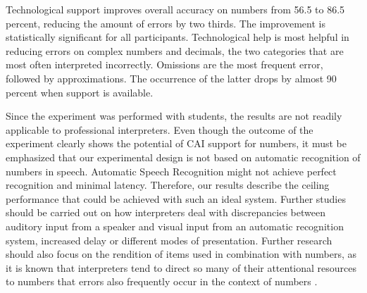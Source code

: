 \documentclass[output=paper]{langsci/langscibook}
\begin{document}
Technological support improves overall accuracy on numbers from 56.5 to 86.5 percent, reducing the amount of errors by two thirds. The improvement is statistically significant for all participants. Technological help is most helpful in reducing errors on complex numbers and decimals, the two categories that are most often interpreted incorrectly. Omissions are the most frequent error, followed by approximations. The occurrence of the latter drops by almost 90 percent when support is available.

Since the experiment was performed with students, the results are not readily applicable to professional interpreters. Even though the outcome of the experiment clearly shows the potential of CAI support for numbers, it must be emphasized that our experimental design is not based on automatic recognition of numbers in speech. Automatic Speech Recognition might not achieve perfect recognition and minimal latency. Therefore, our results describe the ceiling performance that could be achieved with such an ideal system. Further studies should be carried out on how interpreters deal with discrepancies between auditory input from a speaker and visual input from an automatic recognition system, increased delay or different modes of presentation. Further research should also focus on the rendition of items used in combination with numbers, as it is known that interpreters tend to direct so many of their attentional resources to numbers that errors also frequently occur in the context of numbers \citep{Gile1998}.

\sloppy
\printbibliography[heading=subbibliography,notkeyword=this]
\end{document}
